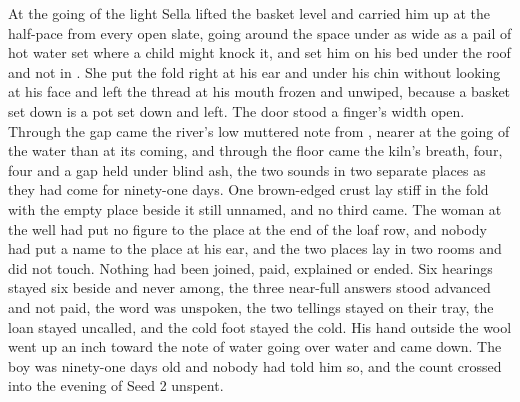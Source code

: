 At the going of the light Sella lifted the basket level and carried him up at the half-pace from every open slate, going around the space under  as wide as a pail of hot water set where a child might knock it, and set him on his bed under the roof and not in . She put the fold right at his ear and under his chin without looking at his face and left the thread at his mouth frozen and unwiped, because a basket set down is a pot set down and left. The door stood a finger's width open. Through the gap came the river's low muttered note from , nearer at the going of the water than at its coming, and through the floor came the kiln's breath, four, four and a gap held under blind ash, the two sounds in two separate places as they had come for ninety-one days. One brown-edged crust lay stiff in the fold with the empty place beside it still unnamed, and no third came. The woman at the well had put no figure to the place at the end of the loaf row, and nobody had put a name to the place at his ear, and the two places lay in two rooms and did not touch. Nothing had been joined, paid, explained or ended. Six hearings stayed six beside and never among, the three near-full answers stood advanced and not paid, the word was unspoken, the two tellings stayed on their tray, the loan stayed uncalled, and the cold foot stayed the cold. His hand outside the wool went up an inch toward the note of water going over water and came down. The boy was ninety-one days old and nobody had told him so, and the count crossed into the evening of Seed 2 unspent.

